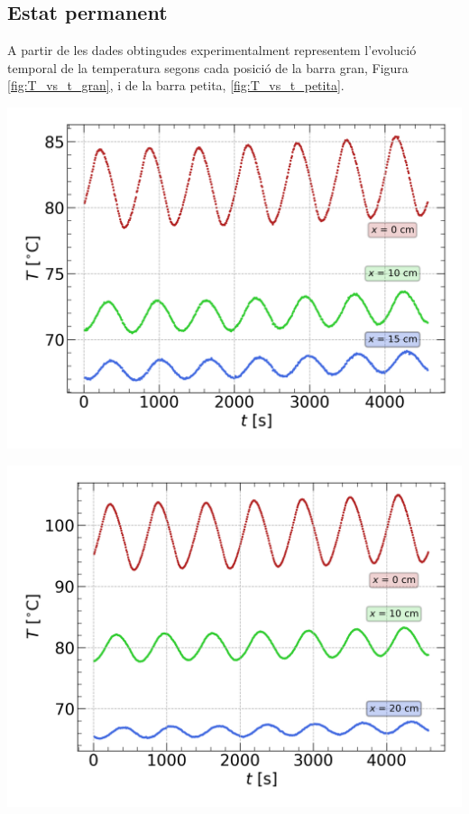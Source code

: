\documentclass[12pt,twosides,onecolumn,openany]{article}
\newenvironment{Figura}
  {\par\medskip\noindent\minipage{\linewidth}}
  {\endminipage\par\medskip}
\begin{document}
\begin{multicols}{2}
\subsection{Estat permanent}
A partir de les dades obtingudes experimentalment representem l'evolució temporal de la temperatura segons cada posició de la barra gran, Figura \ref{fig:T_vs_t_gran}, i de la barra petita, \ref{fig:T_vs_t_petita}.
\begin{Figura}
  \centering
  \includegraphics[width= 1\linewidth]{../../graphs/practica_Ia/plots/gran.png}
  \label{fig:T_vs_t_gran}
\end{Figura}
\begin{Figura}
  \centering
  \includegraphics[width= 1\linewidth]{../../graphs/practica_Ia/plots/petita.png}

\end{Figura}
\end{multicols}
\end{document}

